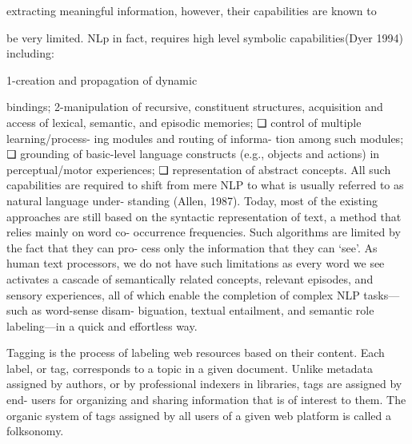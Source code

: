 extracting meaningful information, however, their capabilities are known to 

be very limited. NLp in fact, requires high level symbolic capabilities(Dyer 1994) including:

1-creation and propagation of dynamic 

bindings;
2-manipulation of recursive, constituent structures,
 acquisition and access of lexical, semantic, and episodic memories;
❏ control of multiple learning/process- ing modules and routing of informa- tion among such modules;
❏ grounding of basic-level language constructs (e.g., objects and actions) in perceptual/motor experiences;
❏ representation of abstract concepts.
All such capabilities are required to shift from mere NLP to what is usually referred to as natural language under- standing (Allen, 1987). Today, most of the existing approaches are still based on the syntactic representation of text, a method that relies mainly on word co- occurrence frequencies. Such algorithms are limited by the fact that they can pro- cess only the information that they can ‘see’. As human text processors, we do not have such limitations as every word we see activates a cascade of semantically related concepts, relevant episodes, and sensory experiences, all of which enable the completion of complex NLP tasks—such as word-sense disam- biguation, textual entailment, and semantic role labeling—in a quick and
effortless way.\cite{review on NLP}


Tagging is the process of labeling web resources based on their content. Each label, or tag, corresponds to a topic in a given document. Unlike metadata assigned by authors, or by professional indexers in libraries, tags are assigned by end- users for organizing and sharing information that is of interest to them. The organic system of tags assigned by all users of a given web platform is called a folksonomy. \cite{folksonomy}

